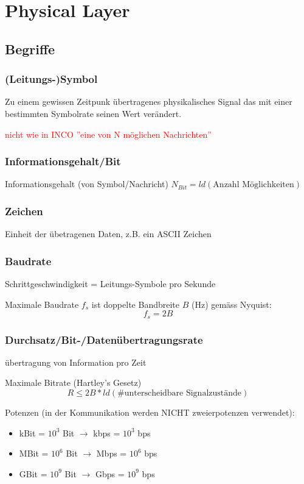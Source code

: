 \section{Physical Layer}

\subsection{Begriffe}

\subsubsection{(Leitungs-)Symbol}
Zu einem gewissen Zeitpunk übertragenes physikalisches Signal das mit einer
bestimmten Symbolrate seinen Wert verändert.

\textcolor{red}{nicht wie in INCO ''eine von N möglichen Nachrichten''}

\subsubsection{Informationsgehalt/Bit}
Informationsgehalt (von Symbol/Nachricht)
$ N_{Bit} = ld(\text{Anzahl Möglichkeiten}) $

\subsubsection{Zeichen}
Einheit der übetragenen Daten, z.B. ein ASCII Zeichen

\subsubsection{Baudrate}
Schrittgeschwindigkeit = Leitungs-Symbole pro Sekunde

Maximale Baudrate $f_s$ ist doppelte Bandbreite $B$ (Hz) gemäss Nyquist:
$$f_s = 2B$$

\subsubsection{Durchsatz/Bit-/Datenübertragungsrate}
übertragung von Information pro Zeit

Maximale Bitrate (Hartley's Gesetz)
$$R \le 2B * ld(\text{\#unterscheidbare Signalzustände})$$

Potenzen (in der Kommunikation werden NICHT zweierpotenzen verwendet):
\begin{itemize}
    \item kBit = $10^3$ Bit $\rightarrow$ kbps = $10^3$ bps
    \item MBit = $10^6$ Bit $\rightarrow$ Mbps = $10^6$ bps
    \item GBit = $10^9$ Bit $\rightarrow$ Gbps = $10^9$ bps
\end{itemize}

